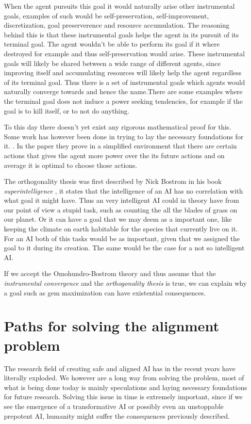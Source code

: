 \documentclass[12pt,A4]{report}
\theoremstyle{definition}
\begin{document}
When the agent pursuits this goal it would naturally arise other instrumental goals, examples of such would be self-preservation, self-improvement, discretization, goal preserverence and resource accumulation. The reasoning behind this is that these instrumental goals helps the agent in its pursuit of its terminal goal. The agent wouldn't be able to perform its goal if it where destroyed for example and thus self-preservation would arise. These instrumental goals will likely be shared between a wide range of different agents, since improving itself and accumulating resources will likely help the agent regardless of its terminal goal. Thus there is a set of instrumental goals which agents would naturally converge towards and hence the name.There are some examples where the terminal goal does not induce a power seeking tendencies, for example if the goal is to kill itself, or to not do anything. 

To this day there doesn't yet exist any rigorous mathematical proof for this. Some work has however been done in trying to lay the necessary foundations for it. \autocite{TURNER et al}. In the paper they prove in a simplified environment that there are certain actions that gives the agent more power over the its future actions and on average it is optimal to choose those actions. 

The orthogonality thesis was first described by Nick Bostrom in his book \textit{superintelligence} \cite{Bostrom}, it states that the intelligence of an AI has no correlation with what goal it might have. Thus an very intelligent AI could in theory have from our point of view a stupid task, such as counting the all the blades of grass on our planet. Or it can have a goal that we may deem as a important one, like keeping the climate on earth habitable for the species that currently live on it. For an AI both of this tasks would be as important, given that we assigned the goal to it during its creation. The same would be the case for a not so intelligent AI.

If we accept the Omohundro-Bostrom theory and thus assume that the \textit{instrumental convergence} and the \textit{orthogonality thesis} is true, we can explain why a goal such as gem maximization can have existential consequences. 


\section{Paths for solving the alignment problem}
The research field of creating safe and aligned AI has in the recent years have literally exploded. We however are a long way from solving the problem, most of what is being done today is mainly speculations and laying necessary foundations for future research. Solving this issue in time is extremely important, since if we see the emergence of a transformative AI or possibly even an unstoppable prepotent AI, humanity might suffer the consequences previously described. 
\end{document}

